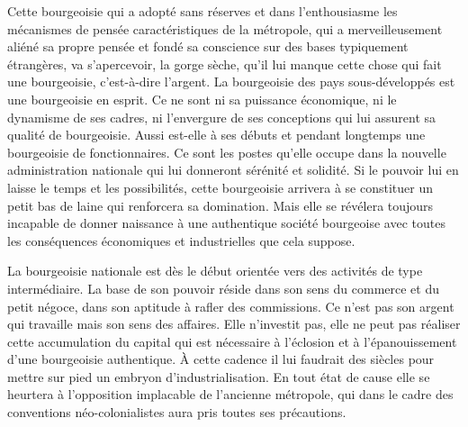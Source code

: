 \documentclass[french,twoside]{book} %
\begin{document}
Cette bourgeoisie qui a adopté sans réserves et dans l’enthousiasme les mécanismes de pensée caractéristiques de la métropole, qui a merveilleusement aliéné sa propre pensée et fondé sa conscience sur des bases typiquement étrangères, va s’apercevoir, la gorge sèche, qu’il lui manque cette chose qui fait une bourgeoisie, c’est-à-dire l’argent. La bourgeoisie des pays sous-développés est une bourgeoisie en esprit. Ce ne sont ni sa puissance économique, ni le dynamisme de ses cadres, ni l’envergure de ses conceptions qui lui assurent sa qualité de bourgeoisie. Aussi est-elle à ses débuts et pendant longtemps une bourgeoisie de fonctionnaires. Ce sont les postes qu’elle occupe dans la nouvelle administration nationale qui lui donneront sérénité et solidité. Si le pouvoir lui en laisse le temps et les possibilités, cette bourgeoisie arrivera à se constituer un petit bas de laine qui renforcera sa domination. Mais elle se révélera toujours incapable de donner naissance à une authentique société bourgeoise avec toutes les conséquences économiques et industrielles que cela suppose.\par
 La bourgeoisie nationale est dès le début orientée vers des activités de type intermédiaire. La base de son pouvoir réside dans son sens du commerce et du petit négoce, dans son aptitude à rafler des commissions. Ce n’est pas son argent qui travaille mais son sens des affaires. Elle n’investit pas, elle ne peut pas réaliser cette accumulation du capital qui est nécessaire à l’éclosion et à l’épanouissement d’une bourgeoisie authentique. À cette cadence il lui faudrait des siècles pour mettre sur pied un embryon d’industrialisation. En tout état de cause elle se heurtera à l’opposition implacable de l’ancienne métropole, qui dans le cadre des conventions néo-colonialistes aura pris toutes ses précautions.\par
\end{document}
